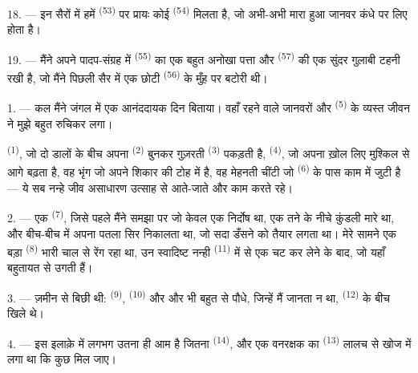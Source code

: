 18. --- इन सैरों में हमें  \textsuperscript{(53)} पर प्रायः कोई
 \textsuperscript{(54)} मिलता है, जो अभी-अभी मारा हुआ
जानवर कंधे पर लिए होता है।

19. --- मैंने अपने पादप-संग्रह में  \textsuperscript{(55)} का एक बहुत
अनोखा पत्ता और  \textsuperscript{(57)} की एक सुंदर गुलाबी टहनी रखी
है, जो मैंने पिछली सैर में एक छोटी  \textsuperscript{(56)} के मुँह पर
बटोरी थी।

\VUsaut{3.0mm}
\VUsaut{3.0mm}

\VUsaut{3.0mm}

1. --- कल मैंने जंगल में एक आनंददायक दिन बिताया। वहाँ रहने वाले जानवरों और
 \textsuperscript{(5)} के व्यस्त जीवन ने मुझे बहुत रुचिकर लगा।

 \textsuperscript{(1)}, जो दो डालों के बीच अपना 
\textsuperscript{(2)} बुनकर गुज़रती  \textsuperscript{(3)} पकड़ती है,
 \textsuperscript{(4)}, जो अपना ख़ोल लिए मुश्किल से आगे बढ़ता है,
वह भृंग जो अपने शिकार की टोह में है, वह मेहनती चींटी जो 
\textsuperscript{(6)} के पास काम में जुटी है — ये सब नन्हे जीव असाधारण उत्साह से
आते-जाते और काम करते रहे।

2. --- एक  \textsuperscript{(7)}, जिसे पहले मैंने  समझा
पर जो केवल एक निर्दोष  था, एक तने के नीचे कुंडली मारे था, और
बीच-बीच में अपना पतला सिर निकालता था, जो सदा डँसने को तैयार लगता था। मेरे सामने
एक बड़ा  \textsuperscript{(8)} भारी चाल से रेंग रहा था, उन स्वादिष्ट
नन्ही  \textsuperscript{(11)} में से एक चट कर लेने के
बाद, जो यहाँ बहुतायत से उगती हैं।

3. --- ज़मीन  से बिछी थी: 
\textsuperscript{(9)},  \textsuperscript{(10)} और और भी बहुत से
पौधे, जिन्हें मैं जानता न था,  \textsuperscript{(12)} के
बीच खिले थे।

4. --- इस इलाक़े में  लगभग उतना ही आम है जितना 
\textsuperscript{(14)}, और एक वनरक्षक का  \textsuperscript{(13)}
लालच से खोज में लगा था कि कुछ मिल जाए।

\VUsaut{3.0mm}
\VUsaut{3.0mm}


